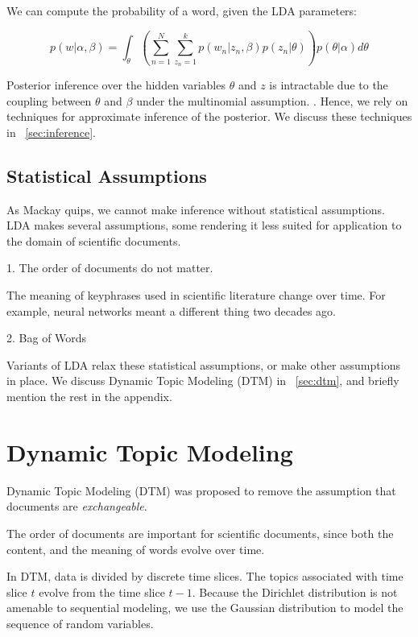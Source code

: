 \documentclass[letterpaper]{article}
\begin{document}
We can compute the probability of a word, given the LDA parameters:

\begin{equation}
  p(w | \alpha, \beta) = \int_\theta \left( \sum_{n=1}^{N}
    \sum_{z_n = 1}^{k} p(w_n | z_n, \beta)p(z_n | \theta) \right)
  p(\theta | \alpha) d\theta
\end{equation}

Posterior inference over the hidden variables $\theta$ and $z$ is
intractable due to the coupling between $\theta$ and $\beta$ under the
multinomial assumption. \citep{blei2003latent}. Hence, we rely on
techniques for approximate inference of the posterior. We discuss these
techniques in ~\autoref{sec:inference}.

\subsection{Statistical Assumptions}
\label{subsec:statistical-assumptions}
As Mackay quips, we cannot make inference without statistical
assumptions. LDA makes several assumptions, some rendering it less
suited for application to the domain of scientific documents.

1. The order of documents do not matter.

The meaning of keyphrases used in scientific literature change over
time. For example, neural networks meant a different thing two decades
ago.

2. Bag of Words

Variants of LDA relax these statistical assumptions, or make other
assumptions in place. We discuss Dynamic Topic Modeling (DTM) in
~\autoref{sec:dtm}, and briefly mention the rest in the appendix.

\section{Dynamic Topic Modeling}
\label{sec:dtm}
Dynamic Topic Modeling (DTM) was proposed to remove the assumption
that documents are \textit{exchangeable}. \citep{blei2006dynamic}

The order of documents are important for scientific documents, since
both the content, and the meaning of words evolve over time.

In DTM, data is divided by discrete time slices. The topics associated
with time slice $t$ evolve from the time slice $t-1$. Because the
Dirichlet distribution is not amenable to sequential modeling, we use
the Gaussian distribution to model the sequence of random variables.
\end{document}
